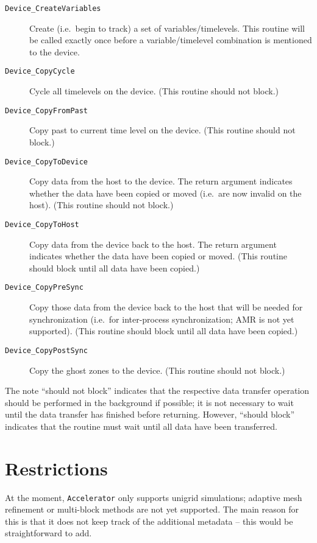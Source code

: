 \begin{description}
\item[\texttt{Device\_CreateVariables}] Create (i.e.\ begin to track)
  a set of variables/timelevels. This routine will be called exactly
  once before a variable/timelevel combination is mentioned to the
  device.
\item[\texttt{Device\_CopyCycle}] Cycle all timelevels on the device.
  (This routine should not block.)
\item[\texttt{Device\_CopyFromPast}] Copy past to current time level
  on the device. (This routine should not block.)
\item[\texttt{Device\_CopyToDevice}] Copy data from the host to the
  device. The return argument indicates whether the data have been
  copied or moved (i.e.\ are now invalid on the host). (This routine
  should not block.)
\item[\texttt{Device\_CopyToHost}] Copy data from the device back to
  the host. The return argument indicates whether the data have been
  copied or moved. (This routine should block until all data have been
  copied.)
\item[\texttt{Device\_CopyPreSync}] Copy those data from the device
  back to the host that will be needed for synchronization (i.e.\ for
  inter-process synchronization; AMR is not yet supported). (This
  routine should block until all data have been copied.)
\item[\texttt{Device\_CopyPostSync}] Copy the ghost zones to the
  device. (This routine should not block.)
\end{description}

The note ``should not block'' indicates that the respective data
transfer operation should be performed in the background if possible;
it is not necessary to wait until the data transfer has finished
before returning. However, ``should block'' indicates that the routine
must wait until all data have been transferred.



\section{Restrictions}

At the moment, \texttt{Accelerator} only supports unigrid simulations;
adaptive mesh refinement or multi-block methods are not yet supported.
The main reason for this is that it does not keep track of the
additional metadata -- this would be straightforward to add.

